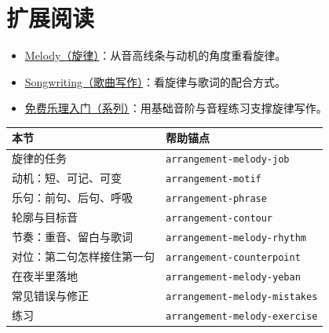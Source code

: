 \section{扩展阅读}
\label{sec:05-melody-further-reading}
\begin{itemize}
  \item \href{https://en.wikipedia.org/wiki/Melody}{Melody（旋律）}：从音高线条与动机的角度重看旋律。
  \item \href{https://en.wikipedia.org/wiki/Songwriting}{Songwriting（歌曲写作）}：看旋律与歌词的配合方式。
  \item \href{https://www.youtube.com/watch?v=6gHEIF0rT2w}{免费乐理入门（系列）}：用基础音阶与音程练习支撑旋律写作。
\end{itemize}

\begin{helpmapping}
\begin{longtable}{p{}p{}}
\toprule
本节 & 帮助锚点 \\
\midrule
旋律的任务 & \texttt{arrangement-melody-job} \\
动机：短、可记、可变 & \texttt{arrangement-motif} \\
乐句：前句、后句、呼吸 & \texttt{arrangement-phrase} \\
轮廓与目标音 & \texttt{arrangement-contour} \\
节奏：重音、留白与歌词 & \texttt{arrangement-melody-rhythm} \\
对位：第二句怎样接住第一句 & \texttt{arrangement-counterpoint} \\
在夜半里落地 & \texttt{arrangement-melody-yeban} \\
常见错误与修正 & \texttt{arrangement-melody-mistakes} \\
练习 & \texttt{arrangement-melody-exercise} \\
\bottomrule
\end{longtable}
\end{helpmapping}
